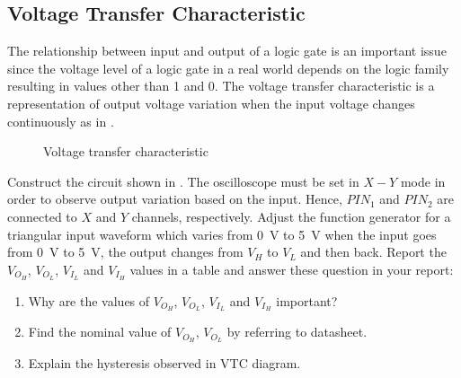 \documentclass[12pt, logo=tehranDLDL/ut]{tehranDLDL}
\begin{document}
\subsection{Voltage Transfer Characteristic}

The relationship between input and output of a logic gate is an important issue since the voltage level of a logic gate in a real world depends on the logic family resulting in values other than 1 and 0. The voltage transfer characteristic is a representation of output voltage variation when the input voltage changes continuously as in .

\begin{figure}
    \centering
    \caption{Voltage transfer characteristic\label{fig:vtc}}
\end{figure}

Construct the circuit shown in . The oscilloscope must be set in $X-Y$ mode in order to observe output variation based on the input. Hence, $\mathit{PIN}_1$ and $\mathit{PIN}_2$ are connected to $X$ and $Y$ channels, respectively. Adjust the function generator for a triangular input waveform which varies from \SI{0}{\volt} to \SI{+5}{\volt} when the input goes from \SI{0}{\volt} to \SI{+5}{\volt}, the output changes from $V_H$ to $V_L$ and then back. Report the $V_{O_H}$, $V_{O_L}$, $V_{I_L}$ and $V_{I_H}$ values in a table and answer these question in your report:
\begin{enumerate}
    \item Why are the values of $V_{O_H}$, $V_{O_L}$, $V_{I_L}$ and $V_{I_H}$ important?
    \item Find the nominal value of $V_{O_H}$, $V_{O_L}$ by referring to datasheet.
    \item Explain the hysteresis observed in VTC diagram.
\end{enumerate}
\end{document}
